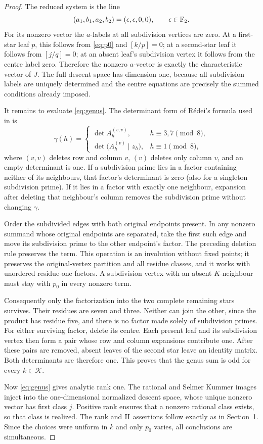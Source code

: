 \documentclass[11pt,a4paper]{article}
\theoremstyle{remark}\newtheorem{remark}[theorem]{Remark}
\begin{document}
\begin{proof}
The reduced system is the line
\[
 (a_1,b_1,a_2,b_2)=(\epsilon,\epsilon,0,0),\qquad\epsilon\in\mathbb F_2.
\]
For its nonzero vector the $a$-labels at all subdivision vertices
are zero. At a first-star leaf $p$, this follows from
\eqref{eq:p0} and $[k/p]=0$; at a second-star leaf it follows
from $[j/q]=0$; at an absent leaf's subdivision vertex it follows
from the centre label zero. Therefore the nonzero $a$-vector is
exactly the characteristic vector of $J$. The full descent space
has dimension one, because all subdivision labels are uniquely
determined and the centre equations are precisely the summed
conditions already imposed.

It remains to evaluate \eqref{eq:genus}. The determinant form of
R\'edei's formula used in \cite[(2.5)]{BB} is
\[
 \gamma(h)=
 \begin{cases}
 \det A_h^{(v,v)},&h\equiv3,7\pmod8,\\
 \det\bigl(A_h^{(v)}\mid z_h\bigr),&h\equiv1\pmod8,
 \end{cases}
\]
where $(v,v)$ deletes row and column $v$, $(v)$ deletes only
column $v$, and an empty determinant is one.
If a subdivision prime lies in a factor containing neither of its
neighbours, that factor's determinant is zero (also for a singleton
subdivision prime). If it lies in a factor with exactly one neighbour,
expansion after deleting that neighbour's column removes the subdivision
prime without changing $\gamma$.

Order the subdivided edges with both original endpoints present.
In any nonzero summand whose original endpoints are separated, take
the first such edge and move its subdivision prime to the other endpoint's
factor. The preceding deletion rule preserves the term. This operation
is an involution without fixed points; it preserves the original-vertex
partition and all residue classes, and it works with unordered
residue-one factors. A subdivision vertex with an absent $K$-neighbour
must stay with $p_0$ in every nonzero term.

Consequently only the factorization into the two complete remaining
stars survives. Their residues are seven and three. Neither can join
the other, since the product has residue five, and there is no factor
made solely of subdivision primes. For either surviving factor,
delete its centre. Each present leaf and its subdivision vertex then
form a pair whose row and column expansions contribute one. After
these pairs are removed, absent leaves of the second star leave an
identity matrix. Both determinants are therefore one. This proves
that the genus sum is odd for every $k\in\mathcal K$.

Now \eqref{eq:genus} gives analytic rank one. The rational and Selmer
Kummer images inject into the one-dimensional normalized descent
space, whose unique nonzero vector has first class $j$. Positive rank
ensures that a nonzero rational class exists, so that class is realized.
The rank and $\mathop{\amalg}$ assertions follow exactly as in Section~1.
Since the choices were uniform in $k$ and only $p_0$ varies, all
conclusions are simultaneous.
\end{proof}
\end{document}
